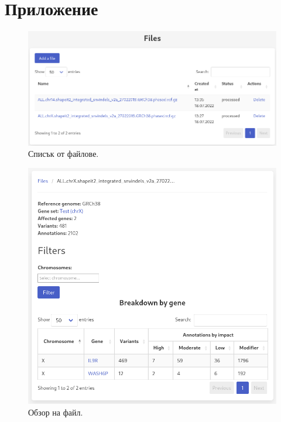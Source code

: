 \documentclass[pdftex,cyrillic,14pt,a4page,twoside,openright]{extreport}
\begin{document}
\cleardoublepage
\chapter*{Приложение}
{}

\begin{figure}[h]
  \centering
  \includegraphics[width=16cm]{figures/list_files}
  \caption {Списък от файлове.}
  \label{fig:list_files}
\end{figure}


\begin{figure}[ht]
  \centering
  \includegraphics[width=16cm]{figures/file_summary}
  \caption {Обзор на файл.}
  \label{fig:file_summary}
\end{figure}
\end{document}
